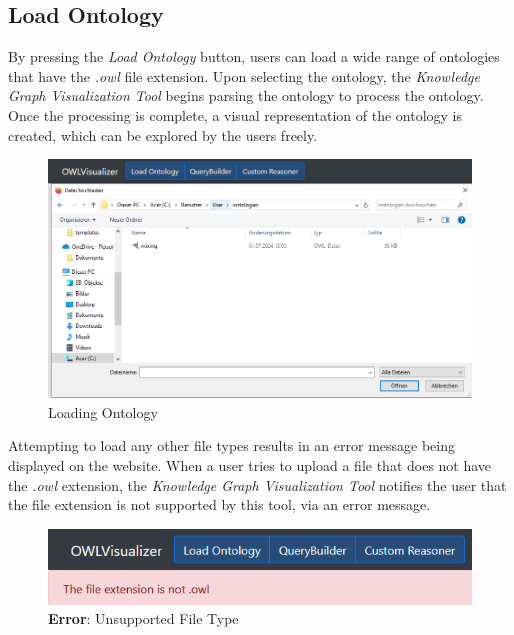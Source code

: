 \subsection{Load Ontology}

By pressing the \textit{Load Ontology} button, users can load a wide range of ontologies that have the \textit{.owl} file extension.
Upon selecting the ontology, the \textit{Knowledge Graph Visualization Tool} begins parsing the ontology to process the ontology. 
Once the processing is complete, a visual representation of the ontology is created, which can be explored by the users freely. 


\begin{figure}[H]
    \includegraphics[scale=0.35]{Graphics/OwlVisualizer/loadOntology1.png}
    \centering
    \caption{Loading Ontology}
    \label{fig:loadOntology1}
\end{figure}

Attempting to load any other file types results in an error message being displayed on the website. 
When a user tries to upload a file that does not have the \textit{.owl} extension, the \textit{Knowledge Graph Visualization Tool} notifies 
the user that the file extension is not supported by this tool, via an error message. 

\begin{figure}[H]
    \includegraphics[scale=0.5]{Graphics/OwlVisualizer/loadOntology2.png}
    \centering
    \caption{\textbf{Error}: Unsupported File Type}
    \label{fig:loadOntology2}
\end{figure}


